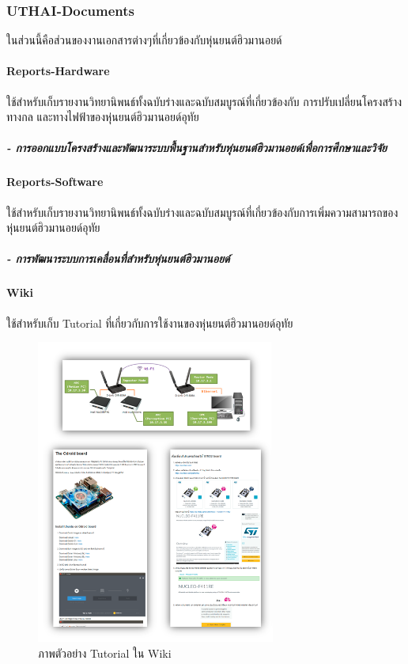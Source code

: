 \clearpage
\subsubsection*{UTHAI-Documents}
ในส่วนนี้คือส่วนของงานเอกสารต่างๆที่เกี่ยวข้องกับหุ่นยนต์ฮิวมานอยด์

\paragraph*{Reports-Hardware}
ใช้สำหรับเก็บรายงานวิทยานิพนธ์ทั้งฉบับร่างและฉบับสมบูรณ์ที่เกี่ยวข้องกับ การปรับเปลี่ยนโครงสร้างทางกล และทางไฟฟ้าของหุ่นยนต์ฮิวมานอยด์อุทัย
\subparagraph*{- การออกแบบโครงสร้างและพัฒนาระบบพื้นฐานสำหรับหุ่นยนต์ฮิวมานอยด์เพื่อการศึกษาและวิจัย}

\paragraph*{Reports-Software}
ใช้สำหรับเก็บรายงานวิทยานิพนธ์ทั้งฉบับร่างและฉบับสมบูรณ์ที่เกี่ยวข้องกับการเพิ่มความสามารถของหุ่นยนต์ฮิวมานอยด์อุทัย
\subparagraph*{- การพัฒนาระบบการเคลื่อนที่สำหรับหุ่นยนต์ฮิวมานอยด์}

\paragraph*{Wiki}
ใช้สำหรับเก็บ Tutorial ที่เกี่ยวกับการใช้งานของหุ่นยนต์ฮิวมานอยด์อุทัย

\begin{figure}[!ht]
	\centering
	\includegraphics[width=0.7\textwidth]{chapter4/images/uthai_platform/uthai_doc.png}
	\caption{ภาพตัวอย่าง Tutorial ใน Wiki}
	\label{fig:uthai_platform_uthai_doc}
\end{figure}

